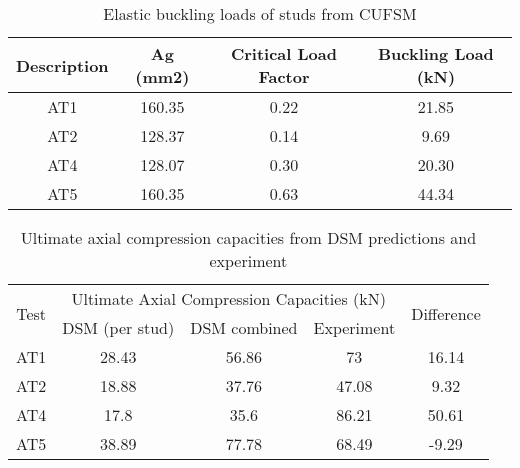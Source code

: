 \begin{table}[htbp]
	\centering
	\caption{Elastic buckling loads of studs from CUFSM}
	  \begin{tabular}{cccc}
	  \toprule
	  Description & Ag (mm2) & Critical Load Factor & Buckling Load (kN) \\
	  \midrule
	  AT1   & 160.35 & 0.22  & 21.85 \\
	  AT2   & 128.37 & 0.14  & 9.69 \\
	  AT4   & 128.07 & 0.30  & 20.30 \\
	  AT5   & 160.35 & 0.63  & 44.34 \\
	  \bottomrule
	  \end{tabular}%
	\label{tab:elastic-CUFSM}%
  \end{table}%

\begin{table}[htbp]
	\centering
	\caption{Ultimate axial compression capacities from DSM predictions and experiment}
	  \begin{tabular}{ccccc}
	  \toprule
	  \multirow{2}[4]{*}{Test} & \multicolumn{3}{c}{Ultimate Axial Compression Capacities (kN)} & \multirow{2}[4]{*}{Difference} \\
  \cmidrule{2-4}          & DSM (per stud) & DSM combined & Experiment &  \\
	  \midrule
	  AT1   & 28.43 & 56.86 & 73    & 16.14 \\
	  AT2   & 18.88 & 37.76 & 47.08 & 9.32 \\
	  AT4   & 17.8  & 35.6  & 86.21 & 50.61 \\
	  AT5   & 38.89 & 77.78 & 68.49 & -9.29 \\
	  \bottomrule
	  \end{tabular}%
	\label{tab:dsm-ambient}%
  \end{table}%
    
